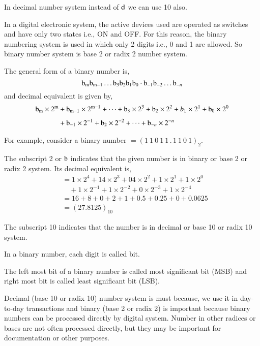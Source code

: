 In decimal number system instead of $\textrm{d}$ we can use 10 also.

\smallskip
{}

In a digital electronic system, the active devices used are operated as switches and have only two states i.e., ON and OFF. For this reason, the binary numbering system is used in which only 2 digits i.e., 0 and 1 are allowed. So binary number system is base 2 or radix 2 number system.

The general form of a binary number is,
$$
\textrm{b}_{\textrm{m}}\textrm{b}_{\textrm{m}-1}\ldots \textrm{b}_{3}\textrm{b}_{2}\textrm{b}_{1}\textrm{b}_{0}\cdot \textrm{b}_{-1}\textrm{b}_{-2}\ldots \textrm{b}_{-n}
$$
and decimal equivalent is given by,
\begin{align*}
\textrm{b}_{\textrm{m}}\times 2^{\textrm{m}} &+ \textrm{b}_{\textrm{m}-1}\times 2^{\textrm{m}-1}+\cdots+\textrm{b}_{3}\times 2^{3}+\textrm{b}_{2}\times 2^{2}+b_{1}\times 2^{1}+\textrm{b}_{0}\times 2^{0}\\[3pt]
&+ \textrm{b}_{-1}\times 2^{-1}+\textrm{b}_{2}\times 2^{-2}+\cdots+\textrm{b}_{-n}\times 2^{-n}
\end{align*}

For example, consider a binary number $=(1~1~0~1~1\,.\,1~1~0~1)_{2}$.

The subscript 2 or $\textrm{b}$ indicates that the given number is in binary or base 2 or radix 2 system. Its decimal equivalent is,
\begin{align*}
&= 1\times 2^{4}+14\times 2^{3}+04\times 2^{2}+1\times 2^{1}+1\times 2^{0}\\
&\quad +1\times 2^{-1}+1\times 2^{-2}+0\times 2^{-3}+1\times 2^{-4}\\
&=16+8+0+2+1+0.5+0.25+0+0.0625\\
&=(27.8125)_{10}
\end{align*}

The subscript 10 indicates that the number is in decimal or base 10 or radix 10 system.

In a binary number, each digit is called bit.

The left most bit of a binary number is called most significant bit (MSB) and right most bit is called least significant bit (LSB).

\smallskip
{}

Decimal (base 10 or radix 10) number system is must because, we use it in day-to-day transactions and binary (base 2 or radix 2) is important because binary numbers can be processed directly by digital system. Number in other radices or bases are not often processed directly, but they may be important for documentation or other purposes.

